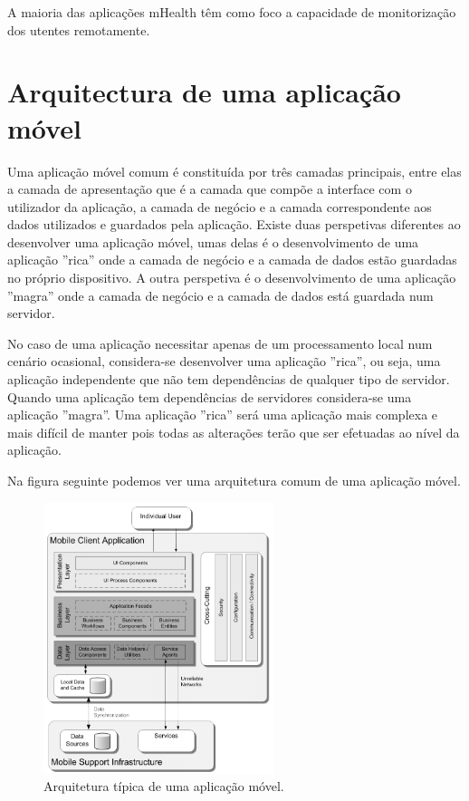 \documentclass[11pt,twoside,a4paper]{report}
\begin{document}
A maioria das aplica\c c\~oes mHealth t\^em como foco a capacidade de monitoriza\c c\~ao dos utentes remotamente.

\section{Arquitectura de uma aplica\c c\~ao m\'ovel}

Uma aplicação móvel comum é constituída por três camadas principais, entre elas a camada de apresentação que é a camada que compõe a interface com o utilizador da aplicação, a camada de negócio e a camada correspondente aos dados utilizados e guardados pela aplicação. Existe duas perspetivas diferentes ao desenvolver uma aplicação móvel, umas delas é o desenvolvimento de uma aplicação ''rica'' onde a camada de negócio e a camada de dados estão guardadas no próprio dispositivo. A outra perspetiva é o desenvolvimento de uma aplicação ''magra'' onde a camada de negócio e a camada de dados está guardada num servidor. 

No caso de uma aplicação necessitar apenas de um processamento local num cenário ocasional, considera-se desenvolver uma aplicação ''rica'', ou seja, uma aplicação independente que não tem dependências de qualquer tipo de servidor. Quando uma aplicação tem dependências de servidores considera-se uma aplicação ''magra''. Uma aplicação ''rica'' será uma aplicação mais complexa e mais difícil de manter pois todas as alterações terão que ser efetuadas ao nível da aplicação.


Na figura seguinte podemos ver uma arquitetura comum de uma aplicação móvel. \cite{mobileappbook}

\begin{figure}[H]
  \centering
  \includegraphics[width=0.6\textwidth]{imgs/mobileapparch.png}
  \caption[Arquitetura t\'ipica de uma  aplica\c c\~ao móvel]{Arquitetura t\'ipica de uma  aplica\c c\~ao móvel. \cite{mobileappbook}}
  
  \label{f:mobileapparch}
\end{figure}
\end{document}
